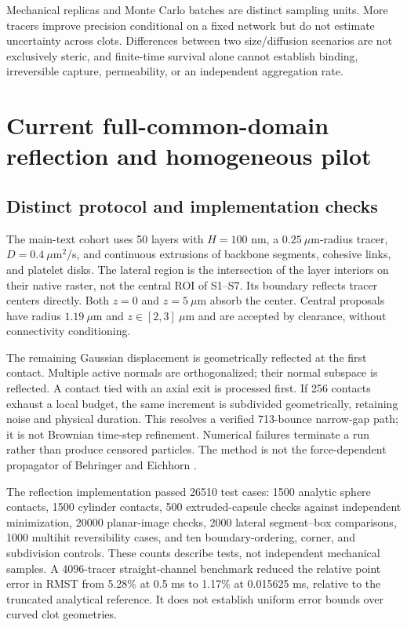 \documentclass[a4paper,10pt]{article}
\numberwithin{equation}{section}
\begin{document}
Mechanical replicas and Monte Carlo batches are distinct sampling units. More tracers improve precision conditional on a fixed network but do not estimate uncertainty across clots. Differences between two size/diffusion scenarios are not exclusively steric, and finite-time survival alone cannot establish binding, irreversible capture, permeability, or an independent aggregation rate.

\clearpage
\section{Current full-common-domain reflection and homogeneous pilot}
\label{sec:current-reflection}
\subsection*{Distinct protocol and implementation checks}
The main-text cohort uses 50 layers with $H=100$ nm, a $0.25~\mu$m-radius tracer, $D=0.4~\mu$m$^2$/s, and continuous extrusions of backbone segments, cohesive links, and platelet disks. The lateral region is the intersection of the layer interiors on their native raster, not the central ROI of S1--S7. Its boundary reflects tracer centers directly. Both $z=0$ and $z=5~\mu$m absorb the center. Central proposals have radius $1.19~\mu$m and $z\in[2,3]~\mu$m and are accepted by clearance, without connectivity conditioning.

The remaining Gaussian displacement is geometrically reflected at the first contact. Multiple active normals are orthogonalized; their normal subspace is reflected. A contact tied with an axial exit is processed first. If 256 contacts exhaust a local budget, the same increment is subdivided geometrically, retaining noise and physical duration. This resolves a verified 713-bounce narrow-gap path; it is not Brownian time-step refinement. Numerical failures terminate a run rather than produce censored particles. The method is not the force-dependent propagator of Behringer and Eichhorn \cite{BehringerEichhorn2012}.

The reflection implementation passed 26510 test cases: 1500 analytic sphere contacts, 1500 cylinder contacts, 500 extruded-capsule checks against independent minimization, 20000 planar-image checks, 2000 lateral segment--box comparisons, 1000 multihit reversibility cases, and ten boundary-ordering, corner, and subdivision controls. These counts describe tests, not independent mechanical samples. A 4096-tracer straight-channel benchmark reduced the relative point error in RMST from 5.28\% at 0.5 ms to 1.17\% at 0.015625 ms, relative to the truncated analytical reference. It does not establish uniform error bounds over curved clot geometries.
\end{document}
